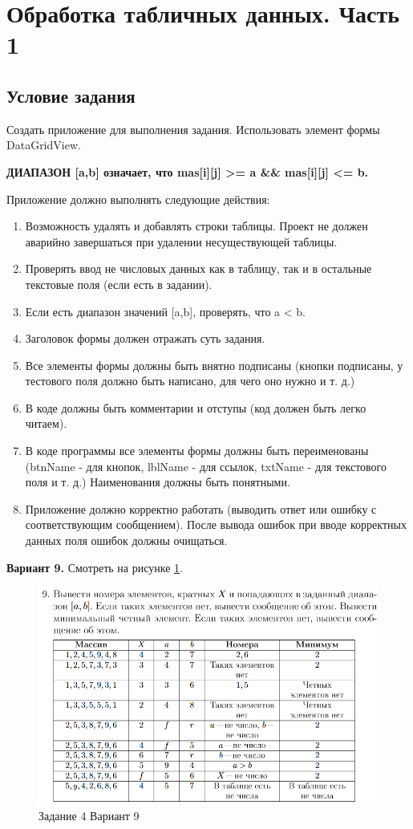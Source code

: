 \section{Обработка табличных данных. Часть 1 }

\subsection{Условие задания}
Создать приложение для выполнения задания. Использовать элемент формы DataGridView. 

\textbf{ДИАПАЗОН [a,b] означает, что mas[i][j] >= a \&\& mas[i][j] <= b.}

Приложение должно выполнять следующие действия:

\begin{enumerate}
    \item Возможность удалять и добавлять строки таблицы. Проект не должен аварийно завершаться при удалении несуществующей таблицы.
    \item Проверять ввод не числовых данных как в таблицу, так и в остальные текстовые поля (если есть в задании).
    \item Если есть диапазон значений [a,b], проверять, что a < b.
    \item Заголовок формы должен отражать суть задания.
    \item Все элементы формы должны быть внятно подписаны (кнопки подписаны, у тестового поля должно быть написано, для чего оно нужно и т. д.)
    \item В коде должны быть комментарии и отступы (код должен быть легко читаем).
    \item В коде программы все элементы формы должны быть переименованы (btnName -  для кнопок, lblName - для ссылок, txtName - для текстового поля и т. д.) Наименования должны быть понятными.
    \item Приложение должно корректно работать (выводить ответ или ошибку с соответствующим сообщением). После вывода ошибок при вводе корректных данных поля ошибок должны очищаться.  
\end{enumerate}

\textbf{Вариант 9.} Смотреть на рисунке \ref{task4_var9}.
\begin{figure}[H]
    \centering
    \includegraphics[width=0.9\linewidth]{lections/img/task4_var9.png}
    \caption{Задание 4 Вариант 9}
    \label{task4_var9}
\end{figure}


